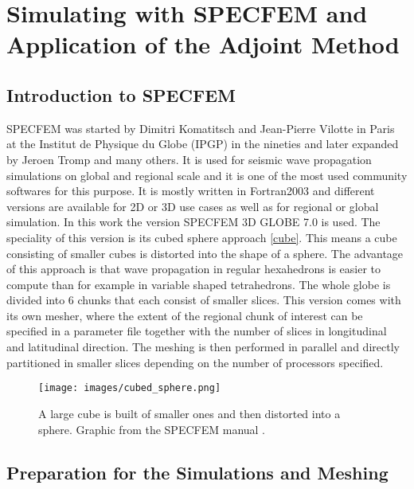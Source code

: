 

\section{Simulating with SPECFEM and Application of the Adjoint Method}

\subsection{Introduction to SPECFEM}

SPECFEM was started by Dimitri Komatitsch and Jean-Pierre Vilotte in Paris at the 
Institut de Physique du Globe (IPGP) \citep{Vilotte1998} in the nineties and later expanded by Jeroen Tromp and many others. 
It is used for seismic wave propagation simulations on global and regional scale and it is one of the 
most used community softwares for this purpose. 
It is mostly written in Fortran2003 and different versions are available for 2D or 3D use cases as well
as for regional or global simulation. 
In this work the version SPECFEM 3D GLOBE 7.0 is used.
The speciality of this version is its cubed sphere approach \autoref{cube}.
This means a cube consisting of smaller cubes is distorted into the shape of a sphere.
The advantage of this approach is that wave propagation in regular hexahedrons is easier to compute than
for example in variable shaped tetrahedrons. %
The whole globe is divided into 6 chunks that each consist of smaller slices.
This version comes with its own mesher, where the extent of the regional chunk of interest can be 
specified in a parameter file together with the number of slices in longitudinal and latitudinal direction.
The meshing is then performed in parallel and directly partitioned in smaller slices depending on the
number of processors specified.



\begin{figure}[h]
\begin{center}
\texttt{[image: images/cubed\_sphere.png]}
\caption{A large cube is built of smaller ones and then distorted into a sphere.
Graphic from the SPECFEM manual \citep{specfem_manual}.}
\label{cube}
\end{center}
\end{figure}


\subsection{Preparation for the Simulations and Meshing}

